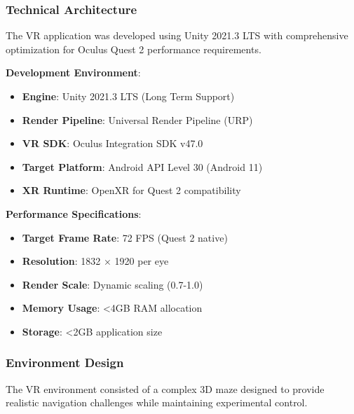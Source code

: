 \documentclass[12pt]{article}
\begin{document}
\subsubsection{Technical Architecture}

The VR application was developed using Unity 2021.3 LTS with comprehensive optimization for Oculus Quest 2 performance requirements.

\textbf{Development Environment}:
\begin{itemize}
    \item \textbf{Engine}: Unity 2021.3 LTS (Long Term Support)
    \item \textbf{Render Pipeline}: Universal Render Pipeline (URP)
    \item \textbf{VR SDK}: Oculus Integration SDK v47.0
    \item \textbf{Target Platform}: Android API Level 30 (Android 11)
    \item \textbf{XR Runtime}: OpenXR for Quest 2 compatibility
\end{itemize}

\textbf{Performance Specifications}:
\begin{itemize}
    \item \textbf{Target Frame Rate}: 72 FPS (Quest 2 native)
    \item \textbf{Resolution}: 1832 × 1920 per eye
    \item \textbf{Render Scale}: Dynamic scaling (0.7-1.0)
    \item \textbf{Memory Usage}: <4GB RAM allocation
    \item \textbf{Storage}: <2GB application size
\end{itemize}

\subsubsection{Environment Design}

The VR environment consisted of a complex 3D maze designed to provide realistic navigation challenges while maintaining experimental control.
\end{document}
